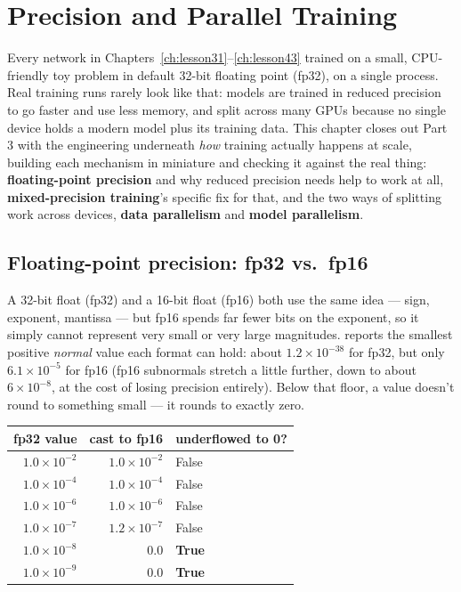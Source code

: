 \chapter{Precision and Parallel Training}
\label{ch:lesson44}

Every network in Chapters~\ref{ch:lesson31}--\ref{ch:lesson43} trained on a small, CPU-friendly toy problem in default 32-bit floating point (fp32), on a single process. Real training runs rarely look like that: models are trained in reduced precision to go faster and use less memory, and split across many GPUs because no single device holds a modern model plus its training data. This chapter closes out Part 3 with the engineering underneath \emph{how} training actually happens at scale, building each mechanism in miniature and checking it against the real thing: \textbf{floating-point precision} and why reduced precision needs help to work at all, \textbf{mixed-precision training}'s specific fix for that, and the two ways of splitting work across devices, \textbf{data parallelism} and \textbf{model parallelism}.

\section{Floating-point precision: fp32 vs.\ fp16}

A 32-bit float (fp32) and a 16-bit float (fp16) both use the same idea --- sign, exponent, mantissa --- but fp16 spends far fewer bits on the exponent, so it simply cannot represent very small or very large magnitudes.  reports the smallest positive \emph{normal} value each format can hold: about $1.2\times10^{-38}$ for fp32, but only $6.1\times10^{-5}$ for fp16 (fp16 subnormals stretch a little further, down to about $6\times10^{-8}$, at the cost of losing precision entirely). Below that floor, a value doesn't round to something small --- it rounds to exactly zero.

\begin{center}
\renewcommand{\arraystretch}{1.3}
\begin{tabular}{rrl}
\hline
\textbf{fp32 value} & \textbf{cast to fp16} & \textbf{underflowed to 0?} \\
\hline
$1.0\times10^{-2}$ & $1.0\times10^{-2}$ & False \\
$1.0\times10^{-4}$ & $1.0\times10^{-4}$ & False \\
$1.0\times10^{-6}$ & $1.0\times10^{-6}$ & False \\
$1.0\times10^{-7}$ & $1.2\times10^{-7}$ & False \\
$1.0\times10^{-8}$ & $0.0$ & \textbf{True} \\
$1.0\times10^{-9}$ & $0.0$ & \textbf{True} \\
\hline
\end{tabular}
\end{center}

